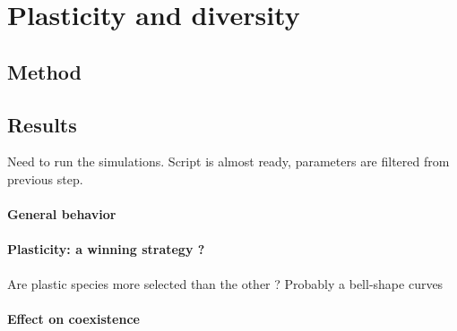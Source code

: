 \section{Plasticity and diversity}
\subsection{Method}

\subsection{Results}

Need to run the simulations. Script is almost ready, parameters are filtered from previous step.

\paragraph{General behavior}
\paragraph{Plasticity: a winning strategy ?}
Are plastic species more selected than the other ? Probably a bell-shape curves

\paragraph{Effect on coexistence}
